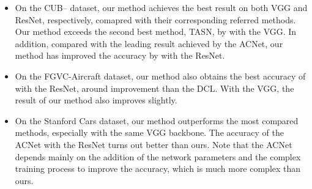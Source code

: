 \documentclass{article}
\begin{document}
\begin{itemize}
    \item On the CUB-- dataset, our method achieves the best result on both VGG and ResNet, respectively, comapred with their corresponding referred methods. Our method exceeds the second best method, TASN, by  with the VGG. In addition, compared with the leading result achieved by the ACNet, our method has improved the accuracy by  with the ResNet. 
    \vspace{-3mm}
    
    \item On the FGVC-Aircraft dataset, our method also obtains the best accuracy of  with the ResNet, around  improvement than the DCL. With the VGG, the result of our method also improves slightly.
    \vspace{-3mm}
    
    \item On the Stanford Cars dataset, our  method outperforms the most compared methods, especially with the same VGG backbone. The accuracy of the ACNet with the ResNet turns out  better than ours. Note that the ACNet depends mainly on the addition of the network parameters and the complex training process to improve the accuracy, which is much more complex than ours.
\end{itemize}


\begin{table}[!t]

    \centering
    \vspace{-2.5mm}
    \caption{Ablation study of our method on classification accuracies (\%). Key modules of the proposed method, including the channel attention, the spatial attention, and the Grad-CAM are compared. 
``'' represents the  module contained, otherwise ``''. The best result is in~\textbf{bold}. }
    \label{ablation}
    
\end{table}
\end{document}
